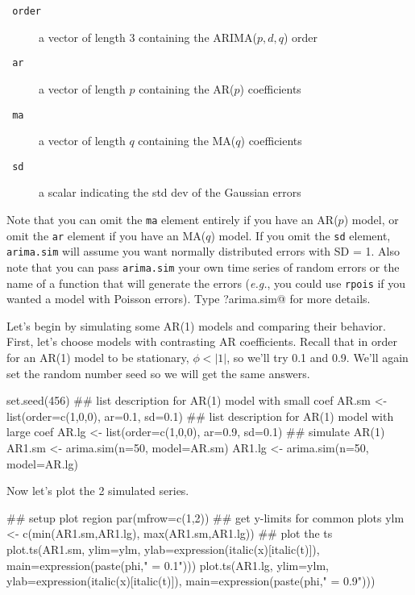 \begin{description}
  \item[\texttt{   order }] a vector of length 3 containing the ARIMA($p,d,q$) order
  \item[\texttt{   ar }] a vector of length $p$ containing the AR($p$) coefficients
  \item[\texttt{   ma }] a vector of length $q$ containing the MA($q$) coefficients
  \item[\texttt{   sd }] a scalar indicating the std dev of the Gaussian errors
\end{description}

\noindent Note that you can omit the \texttt{ma} element entirely if you have an AR($p$) model, or omit the \texttt{ar} element if you have an MA($q$) model.  If you omit the \texttt{sd} element, \texttt{arima.sim} will assume you want normally distributed errors with SD = 1.  Also note that you can pass \texttt{arima.sim} your own time series of random errors or the name of a function that will generate the errors (\emph{e.g.}, you could use \texttt{rpois} if you wanted a model with Poisson errors).  Type \verb@?arima.sim@ for more details. 

Let's begin by simulating some AR(1) models and comparing their behavior.  First, let's choose models with contrasting AR coefficients.  Recall that in order for an AR(1) model to be stationary, $\phi < \lvert 1 \rvert$, so we'll try 0.1 and 0.9.  We'll again set the random number seed so we will get the same answers. 

\begin{Schunk}
\begin{Sinput}
 set.seed(456)
 ## list description for AR(1) model with small coef
 AR.sm <- list(order=c(1,0,0), ar=0.1, sd=0.1)
 ## list description for AR(1) model with large coef
 AR.lg <- list(order=c(1,0,0), ar=0.9, sd=0.1)
 ## simulate AR(1)
 AR1.sm <- arima.sim(n=50, model=AR.sm)
 AR1.lg <- arima.sim(n=50, model=AR.lg)
\end{Sinput}
\end{Schunk}

\noindent Now let's plot the 2 simulated series.

\begin{Schunk}
\begin{Sinput}
 ## setup plot region
 par(mfrow=c(1,2))
 ## get y-limits for common plots
 ylm <- c(min(AR1.sm,AR1.lg), max(AR1.sm,AR1.lg))
 ## plot the ts
 plot.ts(AR1.sm, ylim=ylm,
         ylab=expression(italic(x)[italic(t)]),
         main=expression(paste(phi," = 0.1")))
 plot.ts(AR1.lg, ylim=ylm,
         ylab=expression(italic(x)[italic(t)]),
         main=expression(paste(phi," = 0.9")))
\end{Sinput}
\end{Schunk}


